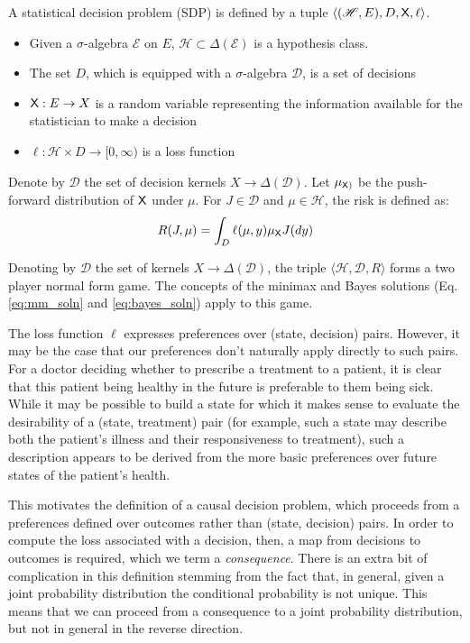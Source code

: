 \begin{definition}
A statistical decision problem (SDP) is defined by a tuple $\langle (\mathscr{H},E), D, \mathsf{X}, \ell\rangle$.
\begin{itemize}
    \item Given a $\sigma$-algebra $\mathcal{E}$ on $E$, $\mathscr{H}\subset\Delta(\mathcal{E})$ is a hypothesis class.
    \item The set $D$, which is equipped with a $\sigma$-algebra $\mathcal{D}$, is a set of decisions
    \item $\mathsf{X}:E\to X$ is a random variable representing the information available for the statistician to make a decision
    \item $\ell:\mathcal{H}\times D\to [0,\infty)$ is a loss function
\end{itemize}

Denote by $\mathscr{D}$ the set of decision kernels $X\to \Delta(\mathcal{D})$. Let $\mu_{\mathsf{X})}$ be the push-forward distribution of $\mathsf{X}$ under $\mu$. For $J\in \mathscr{D}$ and $\mu\in \mathcal{H}$, the risk is defined as:
\begin{align}
    R(J,\mu) = \int_D \ell(\mu,y) \mu_{\mathsf{X}} J(dy)
\end{align}


Denoting by $\mathscr{D}$  the set of kernels $X\to \Delta(\mathcal{D})$, the triple $\langle \mathscr{H}, \mathscr{D}, R\rangle$ forms a two player normal form game. The concepts of the minimax and Bayes solutions (Eq. \ref{eq:mm_soln} and \ref{eq:bayes_soln}) apply to this game.
\end{definition}

The loss function $\ell$ expresses preferences over (state, decision) pairs. However, it may be the case that our preferences don't naturally apply directly to such pairs. For a doctor deciding whether to prescribe a treatment to a patient, it is clear that this patient being healthy in the future is preferable to them being sick. While it may be possible to build a state for which it makes sense to evaluate the desirability of a (state, treatment) pair (for example, such a state may describe both the patient's illness and their responsiveness to treatment), such a description appears to be derived from the more basic preferences over future states of the patient's health.

This motivates the definition of a causal decision problem, which proceeds from a preferences defined over outcomes rather than (state, decision) pairs. In order to compute the loss associated with a decision, then, a map from decisions to outcomes is required, which we term a \emph{consequence}. There is an extra bit of complication in this definition stemming from the fact that, in general, given a joint probability distribution the conditional probability is not unique. This means that we can proceed from a consequence to a joint probability distribution, but not in general in the reverse direction.

